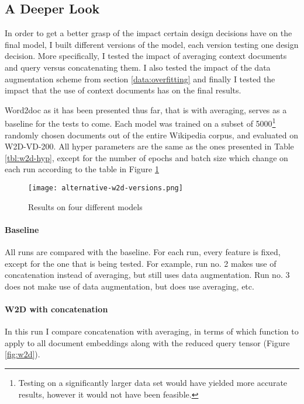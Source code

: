 \subsection{A Deeper Look}
\label{exp:dl}

In order to get a better grasp of the impact certain design decisions have on the final model, I built different versions of the
model, each version testing one design decision. More specifically, I tested the impact of averaging context documents and query
versus concatenating them. I also tested the impact of the data augmentation scheme from section \ref{data:overfitting} and finally I
tested the impact that the use of context documents has on the final results.

Word2doc as it has been presented thus far, that is with averaging, serves as a baseline for the tests to come. Each model was
trained on a subset of 5000\footnote{Testing on a significantly larger data set would have yielded more accurate results, however it
would not have been feasible.} randomly chosen documents out of the entire Wikipedia corpus, and evaluated on W2D-VD-200.
All hyper parameters are the same as the ones presented in Table \ref{tbl:w2d-hyp}, except for the number of epochs and batch
size which change on each run according to the table in Figure \ref{fig:w2d-model-tests}

\begin{figure}
  \begin{center}
    \texttt{[image: alternative-w2d-versions.png]}
  \end{center}
  \caption{Results on four different models}
  \label{fig:w2d-model-tests}
\end{figure}

\paragraph{Baseline}
All runs are compared with the baseline. For each run, every feature is fixed, except for the one that is being
tested. For example, run no. 2 makes use of concatenation instead of averaging, but still uses data augmentation. Run no. 3 does
not make use of data augmentation, but does use averaging, etc.

\paragraph{W2D with concatenation}
In this run I compare concatenation with averaging, in terms of which function to apply to all document embeddings along with the
reduced query tensor (Figure \ref{fig:w2d}).

